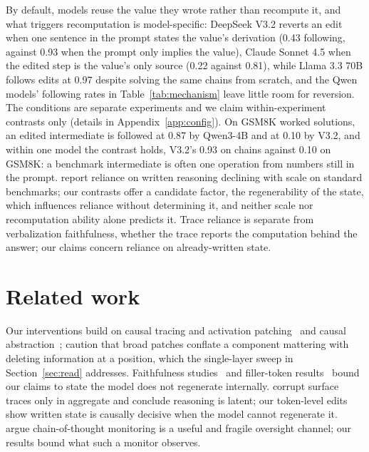 \documentclass{article}
\begin{document}
By default, models reuse the value they wrote rather than recompute it, and what triggers recomputation is model-specific: DeepSeek V3.2 reverts an edit when one sentence in the prompt states the value's derivation (0.43 following, against 0.93 when the prompt only implies the value), Claude Sonnet 4.5 when the edited step is the value's only source (0.22 against 0.81), while Llama 3.3 70B follows edits at 0.97 despite solving the same chains from scratch, and the Qwen models' following rates in Table~\ref{tab:mechanism} leave little room for reversion. The conditions are separate experiments and we claim within-experiment contrasts only (details in Appendix~\ref{app:config}). On GSM8K worked solutions, an edited intermediate is followed at 0.87 by Qwen3-4B and at 0.10 by V3.2, and within one model the contrast holds, V3.2's 0.93 on chains against 0.10 on GSM8K: a benchmark intermediate is often one operation from numbers still in the prompt. \citet{lanham2023faithfulness} report reliance on written reasoning declining with scale on standard benchmarks; our contrasts offer a candidate factor, the regenerability of the state, which influences reliance without determining it, and neither scale nor recomputation ability alone predicts it. Trace reliance is separate from verbalization faithfulness, whether the trace reports the computation behind the answer; our claims concern reliance on already-written state.

\section{Related work}

Our interventions build on causal tracing and activation patching~\citep{meng2022rome} and causal abstraction~\citep{geiger2021causal}; \citet{heimersheim2024patching} caution that broad patches conflate a component mattering with deleting information at a position, which the single-layer sweep in Section~\ref{sec:read} addresses. Faithfulness studies~\citep{turpin2023unfaithful, lanham2023faithfulness} and filler-token results~\citep{pfau2024dot} bound our claims to state the model does not regenerate internally. \citet{latent2026} corrupt surface traces only in aggregate and conclude reasoning is latent; our token-level edits show written state is causally decisive when the model cannot regenerate it. \citet{korbak2025monitor} argue chain-of-thought monitoring is a useful and fragile oversight channel; our results bound what such a monitor observes.
\end{document}
